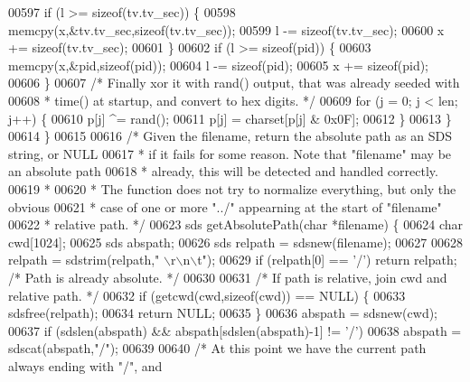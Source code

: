 \begin{DoxyCode}
{{{00597         \textcolor{keywordflow}{if} (l >= \textcolor{keyword}{sizeof}(tv.tv\_sec)) \{
00598             memcpy(x,&tv.tv\_sec,\textcolor{keyword}{sizeof}(tv.tv\_sec));
00599             l -= \textcolor{keyword}{sizeof}(tv.tv\_sec);
00600             x += \textcolor{keyword}{sizeof}(tv.tv\_sec);
00601         \}
00602         \textcolor{keywordflow}{if} (l >= \textcolor{keyword}{sizeof}(pid)) \{
00603             memcpy(x,&pid,\textcolor{keyword}{sizeof}(pid));
00604             l -= \textcolor{keyword}{sizeof}(pid);
00605             x += \textcolor{keyword}{sizeof}(pid);
00606         \}
00607         \textcolor{comment}{/* Finally xor it with rand() output, that was already seeded with}
00608 \textcolor{comment}{         * time() at startup, and convert to hex digits. */}
00609         \textcolor{keywordflow}{for} (j = 0; j < len; j++) \{
00610             p[j] ^= rand();
00611             p[j] = charset[p[j] & 0x0F];
00612         \}
00613     \}
00614 \}
00615 
00616 \textcolor{comment}{/* Given the filename, return the absolute path as an SDS string, or NULL}
00617 \textcolor{comment}{ * if it fails for some reason. Note that "filename" may be an absolute path}
00618 \textcolor{comment}{ * already, this will be detected and handled correctly.}
00619 \textcolor{comment}{ *}
00620 \textcolor{comment}{ * The function does not try to normalize everything, but only the obvious}
00621 \textcolor{comment}{ * case of one or more "../" appearning at the start of "filename"}
00622 \textcolor{comment}{ * relative path. */}
00623 sds getAbsolutePath(\textcolor{keywordtype}{char} *filename) \{
00624     \textcolor{keywordtype}{char} cwd[1024];
00625     sds abspath;
00626     sds relpath = sdsnew(filename);
00627 
00628     relpath = sdstrim(relpath,\textcolor{stringliteral}{" \(\backslash\)r\(\backslash\)n\(\backslash\)t"});
00629     \textcolor{keywordflow}{if} (relpath[0] == \textcolor{stringliteral}{'/'}) \textcolor{keywordflow}{return} relpath; \textcolor{comment}{/* Path is already absolute. */}
00630 
00631     \textcolor{comment}{/* If path is relative, join cwd and relative path. */}
00632     \textcolor{keywordflow}{if} (getcwd(cwd,\textcolor{keyword}{sizeof}(cwd)) == NULL) \{
00633         sdsfree(relpath);
00634         \textcolor{keywordflow}{return} NULL;
00635     \}
00636     abspath = sdsnew(cwd);
00637     \textcolor{keywordflow}{if} (sdslen(abspath) && abspath[sdslen(abspath)-1] != \textcolor{stringliteral}{'/'})
00638         abspath = sdscat(abspath,\textcolor{stringliteral}{"/"});
00639 
00640     \textcolor{comment}{/* At this point we have the current path always ending with "/", and}
}}}
\end{DoxyCode}
